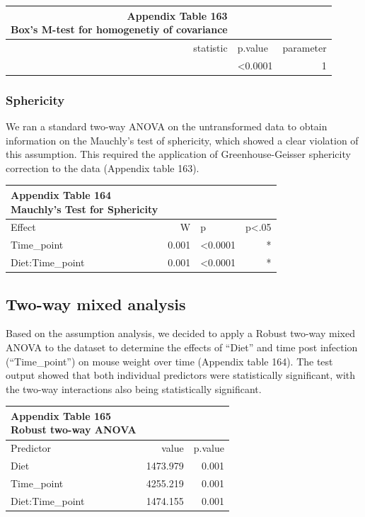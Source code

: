 \documentclass[
  12pt,
  letterpaper,
]{article}
\begin{document}
\begingroup
\fontsize{12.0pt}{14.4pt}\selectfont
\begin{longtable}{rlr}
\caption*{
{\large \textbf{Appendix Table 163}} \\ 
{\small \textbf{Box's M-test for homogenetiy of covariance}}
} \\ 
\toprule
{statistic} & {p.value} & {parameter} \\ 
\midrule\addlinespace[2.5pt]
173.6597 & <0.0001 & 1 \\ 
\bottomrule
\end{longtable}
\endgroup

\subsubsection{Sphericity}\label{sphericity}

We ran a standard two-way ANOVA on the untransformed data to obtain information on the Mauchly's test of sphericity, which showed a clear violation of this assumption. This required the application of Greenhouse-Geisser sphericity correction to the data (Appendix table 163).

\begingroup
\fontsize{12.0pt}{14.4pt}\selectfont
\begin{longtable}{lrlr}
\caption*{
{\large \textbf{Appendix Table 164}} \\ 
{\small \textbf{Mauchly's Test for Sphericity}}
} \\ 
\toprule
{Effect} & {W} & {p} & {p<.05} \\ 
\midrule\addlinespace[2.5pt]
Time\_point & 0.001 & <0.0001 & * \\ 
Diet:Time\_point & 0.001 & <0.0001 & * \\ 
\bottomrule
\end{longtable}
\endgroup

\subsection{Two-way mixed analysis}\label{two-way-mixed-analysis}

Based on the assumption analysis, we decided to apply a Robust two-way mixed ANOVA to the dataset to determine the effects of ``Diet'' and time post infection (``Time\_point'') on mouse weight over time (Appendix table 164). The test output showed that both individual predictors were statistically significant, with the two-way interactions also being statistically significant.

\begingroup
\fontsize{12.0pt}{14.4pt}\selectfont
\begin{longtable}{l|rr}
\caption*{
{\large \textbf{Appendix Table 165}} \\ 
{\small \textbf{Robust two-way ANOVA}}
} \\ 
\toprule
Predictor & {value} & {p.value} \\ 
\midrule\addlinespace[2.5pt]
Diet & 1473.979 & 0.001 \\ 
Time\_point & 4255.219 & 0.001 \\ 
Diet:Time\_point & 1474.155 & 0.001 \\ 
\bottomrule
\end{longtable}
\endgroup
\end{document}
